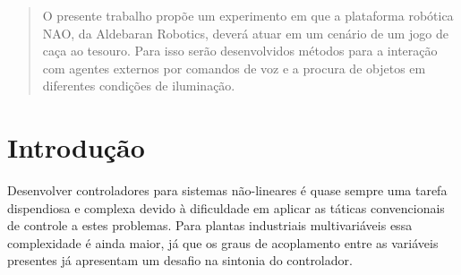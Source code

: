 \documentclass[a0,portrait]{a0poster}
\begin{document}
\vspace{2cm} %


\begin{multicols}{2} %



\color{NavyBlue} %
\begin{abstract}

\fontsize{18}{22}
O presente trabalho propõe um experimento em que a plataforma robótica NAO, da Aldebaran Robotics, deverá atuar em um cenário de um jogo de caça ao tesouro. Para isso serão desenvolvidos métodos para a interação com agentes externos por comandos de voz e a procura de objetos em diferentes condições de iluminação. 

\end{abstract}
\vspace{0.5cm}

\color{DarkSlateGray} %

\section*{Introdução}

\color{Black}

Desenvolver controladores para sistemas não-lineares é quase sempre uma tarefa dispendiosa e complexa devido à dificuldade em aplicar as táticas convencionais de controle a estes problemas. Para plantas industriais multivariáveis essa complexidade é ainda maior, já que os graus de acoplamento entre as variáveis presentes já apresentam um desafio na sintonia do controlador.  
\vspace{1cm}
\color{DarkSlateGray} %


\end{multicols}
\end{document}
